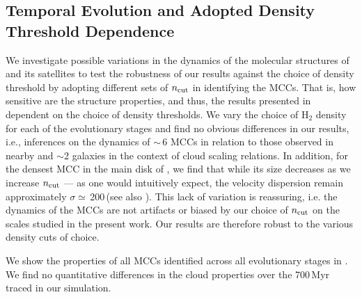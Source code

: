 \IfFileExists{emulateapjlegacy.cls}{\documentclass[iop]{emulateapjlegacy}}{\documentclass[iop]{emulateapj}}
\begin{document}
\subsection{Temporal Evolution and Adopted Density Threshold Dependence}\label{sec:ncut}
We investigate possible variations in the dynamics of the molecular structures of \flower and its satellites to test the robustness of our results against the choice of density threshold by adopting different sets of $n_{\rm cut}$ in identifying the MCCs. That is, how sensitive are the structure properties, and thus, the results presented in  dependent on the choice of density thresholds.
%
We vary the choice of H$_2$ density for each of the evolutionary stages and find no obvious differences in our results, i.e., inferences on the dynamics of \z$\sim$\,6 MCCs in relation to those observed in nearby and \z$\sim$2 galaxies in the context of cloud scaling relations.
%
In addition, for the densest MCC in the main disk of \flower, we find that while its size decreases as we increase $n_{\rm cut}$ --- as one would intuitively expect, the velocity dispersion remain approximately $\sigma\simeq$\,200\,\kms (see also ).
%
This lack of variation is reassuring, i.e. the dynamics of the MCCs are not artifacts or biased by our choice of $n_{\rm cut}$ on the scales studied in the present work. Our results are therefore robust to the various density cuts of choice.

We show the properties of all MCCs identified across all evolutionary stages in . We find no quantitative differences in the cloud properties over the 700\,Myr traced in our simulation.
\end{document}
